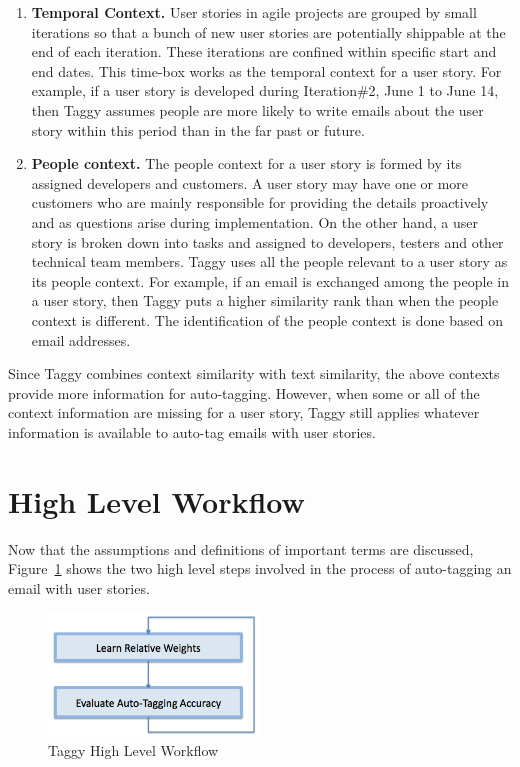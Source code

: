 \begin{enumerate}
	\item \textbf{Temporal Context.} User stories in agile projects are grouped by small iterations so that a bunch of new user stories are potentially shippable at the end of each iteration. These iterations are confined within specific start and end dates. This time-box works as the temporal context for a user story. For example, if a user story is developed during Iteration\#2, June 1 to June 14, then Taggy assumes people are more likely to write emails about the user story within this period than in the far past or future.
	
	\item \textbf{People context.} The people context for a user story is formed by its assigned developers and customers. A user story may have one or more customers who are mainly responsible for providing the details proactively and as questions arise during implementation. On the other hand, a user story is broken down into tasks and assigned to developers, testers and other technical team members. Taggy uses all the people relevant to a user story as its people context. For example, if an email is exchanged among the people in a user story, then Taggy puts a higher similarity rank than when the people context is different. The identification of the people context is done based on email addresses.
\end{enumerate}

Since Taggy combines context similarity with text similarity, the above contexts provide more information for auto-tagging. However, when some or all of the context information are missing for a user story, Taggy still applies whatever information is available to auto-tag emails with user stories.

\section{High Level Workflow}
Now that the assumptions and definitions of important terms are discussed, Figure~\ref{fig:learn_evaluate} shows the two high level steps involved in the process of auto-tagging an email with user stories. 

\begin{figure}[!h]
	\centering
	\includegraphics[width=0.5\textwidth]{learn_evaluate.png}
	\caption{Taggy High Level Workflow}
	\label{fig:learn_evaluate}
\end{figure}


